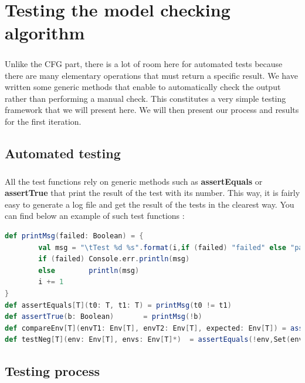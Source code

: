 \documentclass{report}
\begin{document}
\chapter{Testing the model checking algorithm}

\paragraph{}
\hspace{4mm}Unlike the CFG part, there is a lot of room here for automated tests because there are many elementary operations that must return a specific result. We have written some generic methods 
that enable to automatically check the output rather than performing a manual check. This constitutes a very simple 
testing framework that we will present here. We will then present our process and results for the first iteration.

\section{Automated testing}

\paragraph{}
\hspace{4mm}All the test functions rely on generic methods such as \textbf{assertEquals} or \textbf{assertTrue} that print
the result of the test with its number. This way, it is fairly easy to generate a log file and get the result of the tests
in the clearest way. You can find below an example of such test functions :

\begin{lstlisting}[language=scala]
def printMsg(failed: Boolean) = { 
        val msg = "\tTest %d %s".format(i,if (failed) "failed" else "passed") 
        if (failed) Console.err.println(msg)
        else        println(msg)
        i += 1
}
def assertEquals[T](t0: T, t1: T) = printMsg(t0 != t1)
def assertTrue(b: Boolean)       = printMsg(!b)
def compareEnv[T](envT1: Env[T], envT2: Env[T], expected: Env[T]) = assertEquals(envT1 interEnv envT2,expected)    
def testNeg[T](env: Env[T], envs: Env[T]*)  = assertEquals(!env,Set(envs: _*))
\end{lstlisting}
\section{Testing process}
\end{document}
